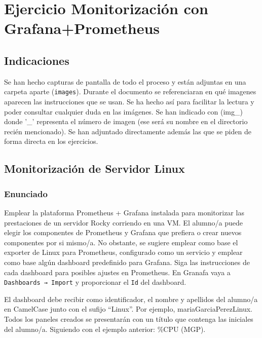 \usepackage[margin=2cm]{geometry}



\hypertarget{ejercicio-monitorizaciuxf3n-con-grafanaprometheus}{%
\section{Ejercicio Monitorización con
Grafana+Prometheus}\label{ejercicio-monitorizaciuxf3n-con-grafanaprometheus}}

\hypertarget{indicaciones}{%
\subsection{Indicaciones}\label{indicaciones}}

Se han hecho capturas de pantalla de todo el proceso y están adjuntas en
una carpeta aparte (\texttt{images}). Durante el documento se
referenciaran en qué imagenes aparecen las instrucciones que se usan. Se
ha hecho así para facilitar la lectura y poder consultar cualquier duda
en las imágenes. Se han indicado con (img\_) donde '\_' representa el
número de imagen (ese será su nombre en el directorio recién
mencionado). Se han adjuntado directamente además las que se piden de
forma directa en los ejercicios.

\hypertarget{monitorizaciuxf3n-de-servidor-linux}{%
\subsection{Monitorización de Servidor
Linux}\label{monitorizaciuxf3n-de-servidor-linux}}

\hypertarget{enunciado}{%
\subsubsection{Enunciado}\label{enunciado}}

Emplear la plataforma Prometheus + Grafana instalada para monitorizar
las prestaciones de un servidor Rocky corriendo en una VM. El alumno/a
puede elegir los componentes de Prometheus y Grafana que prefiera o
crear nuevos componentes por si mismo/a. No obstante, se sugiere emplear
como base el exporter de Linux para Prometheus, configurado como un
servicio y emplear como base algún dashboard predefinido para Grafana.
Siga las instrucciones de cada dashboard para posibles ajustes en
Prometheus. En Granafa vaya a \texttt{Dashboards\ →\ Import} y
proporcionar el \texttt{Id} del dashboard.

El dashboard debe recibir como identificador, el nombre y apellidos del
alumno/a en CamelCase junto con el sufijo ``Linux''. Por ejemplo,
mariaGarciaPerezLinux. Todos los paneles creados se presentarán con un
título que contenga las iniciales del alumno/a. Siguiendo con el ejemplo
anterior: \%CPU (MGP).

